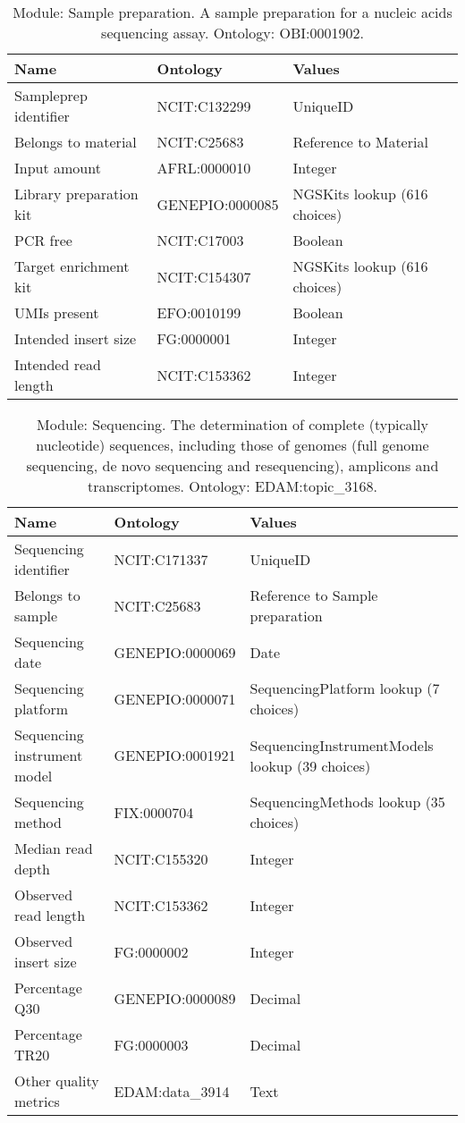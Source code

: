 \documentclass{article}
\begin{document}
\begin{table}[htb]
\begin{tabular}{lll}
Name & Ontology & Values \\
\hline
Sampleprep identifier & NCIT:C132299 & UniqueID \\
Belongs to material & NCIT:C25683 & Reference to Material \\
Input amount & AFRL:0000010 & Integer \\
Library preparation kit & GENEPIO:0000085 & NGSKits lookup (616 choices) \\
PCR free & NCIT:C17003 & Boolean \\
Target enrichment kit & NCIT:C154307 & NGSKits lookup (616 choices) \\
UMIs present & EFO:0010199 & Boolean \\
Intended insert size & FG:0000001 & Integer \\
Intended read length & NCIT:C153362 & Integer \\
\hline
\end{tabular}
\caption[Module: Sample preparation]{\label{table:table8} Module: Sample preparation. A sample preparation for a nucleic acids sequencing assay. Ontology: OBI:0001902. }
\end{table}

\begin{table}[htb]
\begin{tabular}{lll}
Name & Ontology & Values \\
\hline
Sequencing identifier & NCIT:C171337 & UniqueID \\
Belongs to sample & NCIT:C25683 & Reference to Sample preparation \\
Sequencing date & GENEPIO:0000069 & Date \\
Sequencing platform & GENEPIO:0000071 & SequencingPlatform lookup (7 choices) \\
Sequencing instrument model & GENEPIO:0001921 & SequencingInstrumentModels lookup (39 choices) \\
Sequencing method & FIX:0000704 & SequencingMethods lookup (35 choices) \\
Median read depth & NCIT:C155320 & Integer \\
Observed read length & NCIT:C153362 & Integer \\
Observed insert size & FG:0000002 & Integer \\
Percentage Q30 & GENEPIO:0000089 & Decimal \\
Percentage TR20 & FG:0000003 & Decimal \\
Other quality metrics & EDAM:data\_3914 & Text \\
\hline
\end{tabular}
\caption[Module: Sequencing]{\label{table:table9} Module: Sequencing. The determination of complete (typically nucleotide) sequences, including those of genomes (full genome sequencing, de novo sequencing and resequencing), amplicons and transcriptomes. Ontology: EDAM:topic\_3168. }
\end{table}
\end{document}
